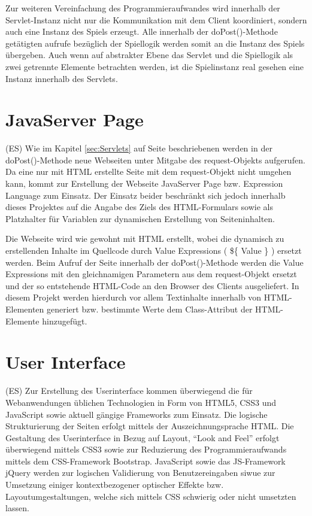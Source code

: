 Zur weiteren Vereinfachung des Programmieraufwandes wird innerhalb der Servlet-Instanz nicht nur die Kommunikation mit dem Client koordiniert, sondern auch eine Instanz des Spiels erzeugt. Alle innerhalb der doPost()-Methode getätigten aufrufe bezüglich der Spiellogik werden somit an die Instanz des Spiels übergeben. Auch wenn auf abstrakter Ebene das Servlet und die Spiellogik als zwei getrennte Elemente betrachten werden, ist die Spielinstanz real gesehen eine Instanz innerhalb des Servlets.

\section{JavaServer Page}
(ES) Wie im Kapitel \ref{sec:Servlets} auf Seite \pageref{sec:Servlets} beschriebenen werden in der doPost()-Methode neue Webseiten unter Mitgabe des request-Objekts aufgerufen. Da eine nur mit HTML erstellte Seite mit dem request-Objekt nicht umgehen kann, kommt zur Erstellung der Webseite JavaServer Page bzw. Expression Language zum Einsatz. Der Einsatz beider beschränkt sich jedoch innerhalb dieses Projektes auf die Angabe des Ziels des HTML-Formulars sowie als Platzhalter für Variablen zur dynamischen Erstellung von Seiteninhalten.

Die Webseite wird wie gewohnt mit HTML erstellt, wobei die dynamisch zu erstellenden Inhalte im Quellcode durch Value Expressions ( \$\{ Value \} ) ersetzt werden. Beim Aufruf der Seite innerhalb der doPost()-Methode werden die Value Expressions mit den gleichnamigen Parametern aus dem request-Objekt ersetzt und der so entstehende HTML-Code an den Browser des Clients ausgeliefert. In diesem Projekt werden hierdurch vor allem Textinhalte innerhalb von HTML-Elementen generiert bzw. bestimmte Werte dem Class-Attribut der HTML-Elemente hinzugefügt.

\section{User Interface}\label{UI}
(ES) Zur Erstellung des Userinterface kommen überwiegend die für Webanwendungen üblichen Technologien in Form von HTML5, CSS3 und JavaScript sowie aktuell gängige Frameworks zum Einsatz. Die logische Strukturierung der Seiten erfolgt mittels der Auszeichnungsprache HTML. Die Gestaltung des Userinterface in Bezug auf Layout, \enquote{Look and Feel} erfolgt überwiegend mittels CSS3 sowie zur Reduzierung des Programmieraufwands mittels dem CSS-Framework Bootstrap. JavaScript sowie das JS-Framework jQuery werden zur logischen Validierung von Benutzereingaben siwue zur Umsetzung einiger kontextbezogener optischer Effekte bzw. Layoutumgestaltungen, welche sich mittels CSS schwierig oder nicht umsetzten lassen.

